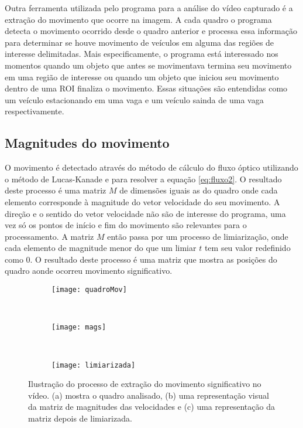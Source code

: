 Outra ferramenta utilizada pelo programa para a análise do vídeo capturado é a extração do movimento que ocorre na imagem. A cada quadro o programa detecta o movimento ocorrido desde o quadro anterior e processa essa informação para determinar se houve movimento de veículos em alguma das regiões de interesse delimitadas. Mais especificamente, o programa está interessado nos momentos quando um objeto que antes se movimentava termina seu movimento em uma região de interesse ou quando um objeto que iniciou seu movimento dentro de uma ROI finaliza o movimento. Essas situações são entendidas como um veículo estacionando em uma vaga e um veículo sainda de uma vaga respectivamente.

\subsection{Magnitudes do movimento}

O movimento é detectado através do método de cálculo do fluxo óptico utilizando o método de Lucas-Kanade\cite{faria1992fluxo}\cite{mota2011tensor} e \cite{bruhn2005lucas} para resolver a equação \ref{eq:fluxo2}. O resultado deste processo é uma matriz $M$ de dimensões iguais as do quadro onde cada elemento corresponde à magnitude do vetor velocidade do seu movimento. A direção e o sentido do vetor velocidade não são de interesse do programa, uma vez só os pontos de início e fim do movimento são relevantes para o processamento. A matriz $M$ então passa por um processo de limiarização, onde cada elemento de magnitude menor do que um limiar $t$ tem seu valor redefinido como $0$. O resultado deste processo é uma matriz que mostra as posições do quadro aonde ocorreu movimento significativo. 



\begin{figure}
\centering
\begin{subfigure}{.5\textwidth}
  \centering
  \texttt{[image: quadroMov]}
  \caption{}
  \label{fig:ilustraMovimento:sub:quadro}
\end{subfigure}\\
\begin{subfigure}{.5\textwidth}
  \centering
  \texttt{[image: mags]}
  \caption{}
  \label{fig:ilustraMovimento:sub:mags}
\end{subfigure}\\
\begin{subfigure}{.5\textwidth}
  \centering
  \texttt{[image: limiarizada]}
  \caption{}
  \label{fig:ilustraMovimento:sub:limiarizada}
\end{subfigure}
\centering
\caption{Ilustração do processo de extração do movimento significativo no vídeo. (a) mostra o quadro analisado, (b) uma representação visual da matriz de magnitudes das velocidades e (c) uma representação da matriz depois de limiarizada.}
\label{fig:ilustraMovimento}
\end{figure}


